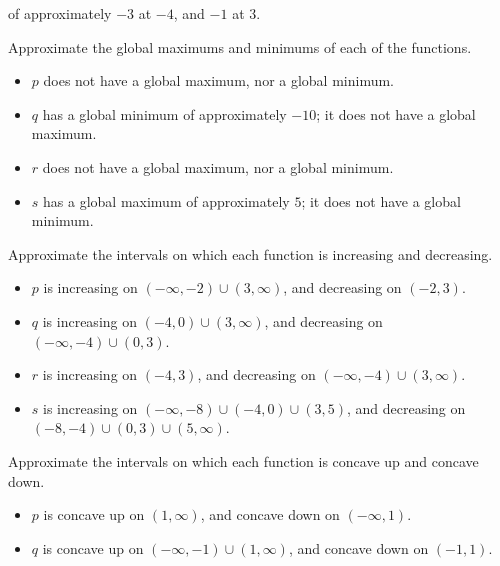 \begin{exercises}
\begin{problem}
\begin{subproblem}
\begin{shortsolution}
\begin{itemize}
 				      of approximately $-3$ at $-4$, and $-1$ at $3$.
 			\end{itemize}
 		\end{shortsolution}
 	\end{subproblem}
 	\begin{subproblem}
 		Approximate the global maximums and minimums of each of the functions.
 		\begin{shortsolution}
 			\begin{itemize}
 				\item $p$ does not have a global maximum, nor a global minimum.
 				\item $q$ has a global minimum of approximately $-10$; it does not have a global maximum.
 				\item $r$ does not have a global maximum, nor a global minimum.
 				\item $s$ has a global maximum of approximately $5$; it does not have a global minimum.
 			\end{itemize}
 		\end{shortsolution}
 	\end{subproblem}
 	\begin{subproblem}
 		Approximate the intervals on which each function is increasing and decreasing.
 		\begin{shortsolution}
 			\begin{itemize}
 				\item $p$ is increasing on $(-\infty,-2)\cup (3,\infty)$, and decreasing on $(-2,3)$.
 				\item $q$ is increasing on $(-4,0)\cup (3,\infty)$, and decreasing on $(-\infty,-4)\cup (0,3)$.
 				\item $r$ is increasing on $(-4,3)$, and decreasing on $(-\infty,-4)\cup (3,\infty)$.
 				\item $s$ is increasing on $(-\infty,-8)\cup (-4,0)\cup (3,5)$, and decreasing on $(-8,-4)\cup (0,3)\cup (5,\infty)$.
 			\end{itemize}
 		\end{shortsolution}
 	\end{subproblem}
 	\begin{subproblem}
 		Approximate the intervals on which each function is concave up and concave down.
 		\begin{shortsolution}
 			\begin{itemize}
 				\item $p$ is concave up on  $(1,\infty)$, and concave down on  $(-\infty,1)$.
 				\item $q$ is concave up on $(-\infty,-1)\cup (1,\infty)$, and concave down on $(-1,1)$.

\end{itemize}
\end{shortsolution}
\end{subproblem}
\end{problem}
\end{exercises}
